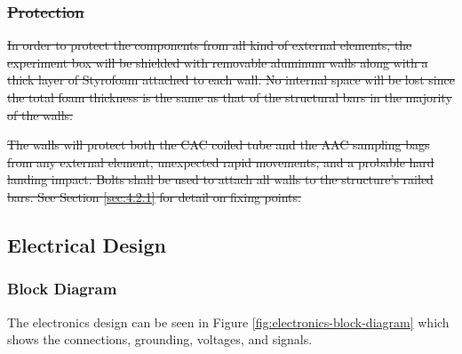 \documentclass[a4paper,12pt,twoside]{article}
\providecommand{\DIFdeltex}[1]{{\protect\color{red}\sout{#1}}}                      %
\providecommand{\DIFdelbegin}{} %
\providecommand{\DIFdelend}{} %
\providecommand{\DIFdel}[1]{\texorpdfstring{\DIFdeltex{#1}}{}} %
\newcommand{\DIFscaledelfig}{0.5}
\newlength{\DIFdelgraphicswidth} %
\newlength{\DIFdelgraphicsheight} %
\newcommand{\DIFdelincludegraphics}[2][]{%
\sbox{\DIFdelgraphicsbox}{\DIFOincludegraphics[#1]{#2}}%
\settoboxwidth{\DIFdelgraphicswidth}{\DIFdelgraphicsbox} %
\settoboxtotalheight{\DIFdelgraphicsheight}{\DIFdelgraphicsbox} %
\scalebox{\DIFscaledelfig}{%
\parbox[b]{\DIFdelgraphicswidth}{\usebox{\DIFdelgraphicsbox}\\[-\baselineskip] \rule{\DIFdelgraphicswidth}{0em}}\llap{\resizebox{\DIFdelgraphicswidth}{\DIFdelgraphicsheight}{%
\setlength{\unitlength}{\DIFdelgraphicswidth}%
\begin{picture}(1,1)%
\thicklines\linethickness{2pt} %
{\color[rgb]{1,0,0}\put(0,0){\framebox(1,1){}}}%
{\color[rgb]{1,0,0}\put(0,0){\line( 1,1){1}}}%
{\color[rgb]{1,0,0}\put(0,1){\line(1,-1){1}}}%
\end{picture}%
}\hspace*{3pt}}} %
} %
\DeclareRobustCommand{\DIFdelbegin}{\DIFOdelbegin \let\includegraphics\DIFdelincludegraphics} %
\DeclareRobustCommand{\DIFdelend}{\DIFOaddend \let\includegraphics\DIFOincludegraphics} %
\begin{document}
\DIFdelbegin %
\subsubsection{\DIFdel{Protection}}
\addtocounter{subsubsection}{-1}%

\DIFdel{In order to protect the components from all kind of external elements, the experiment box will be shielded with removable aluminum walls along with a thick layer of Styrofoam attached to each wall. No internal space will be lost since the total foam thickness is the same as that of the structural bars in the majority of the walls. 
}%

\DIFdel{The walls will protect both the CAC coiled tube and the AAC sampling bags from any external element, unexpected rapid movements, and a probable hard landing impact. %
Bolts shall be used to attach all walls to the structure's railed bars. See Section \ref{sec:4.2.1} for detail on fixing points.
}%



\DIFdelend \raggedbottom
\pagebreak
\subsection{Electrical Design}

\subsubsection{Block Diagram}
\label{sec:4.5.1}

The electronics design can be seen in Figure \ref{fig:electronics-block-diagram} which shows the connections, grounding, voltages, and signals. 
\end{document}
